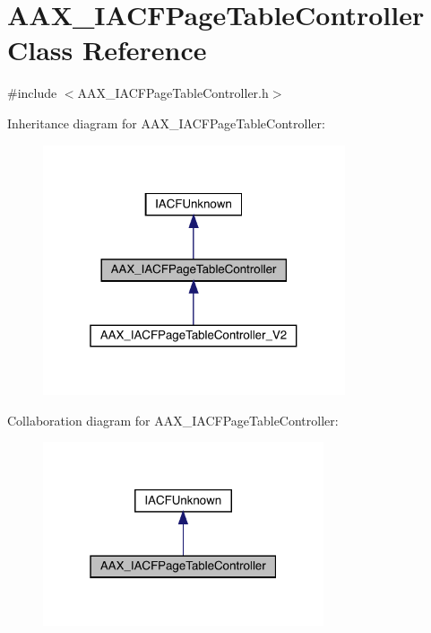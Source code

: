 \hypertarget{a01733}{}\section{A\+A\+X\+\_\+\+I\+A\+C\+F\+Page\+Table\+Controller Class Reference}
\label{a01733}


{\ttfamily \#include $<$A\+A\+X\+\_\+\+I\+A\+C\+F\+Page\+Table\+Controller.\+h$>$}



Inheritance diagram for A\+A\+X\+\_\+\+I\+A\+C\+F\+Page\+Table\+Controller\+:
\nopagebreak
\begin{figure}[H]
\begin{center}
\leavevmode
\includegraphics[width=253pt]{a01732}
\end{center}
\end{figure}


Collaboration diagram for A\+A\+X\+\_\+\+I\+A\+C\+F\+Page\+Table\+Controller\+:
\nopagebreak
\begin{figure}[H]
\begin{center}
\leavevmode
\includegraphics[width=235pt]{a01731}
\end{center}
\end{figure}


